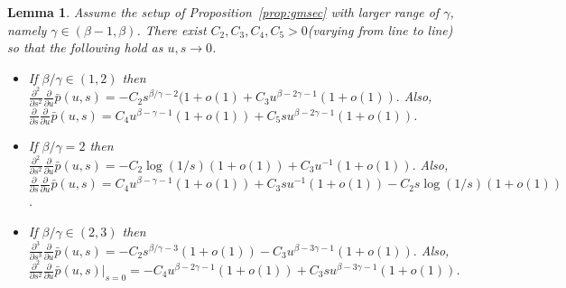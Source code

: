 \documentclass[12pt]{article}
\numberwithin{equation}{section}
\newtheorem{lemma}[thm]{Lemma}
\begin{document}
\begin{lemma}\label{lemma:doubderder} Assume the setup of Proposition~\ref{prop:gmsec} with larger range of $\gamma$,
namely $\gamma\in (\beta-1,\beta)$. There exist $C_2, C_3, C_4, C_5>0$(varying from line to line) so that the following hold as $u,s\to 0$.
\begin{itemize}
\item[(i)] If $\beta/\gamma\in (1,2)$ then 
\(
\frac{\partial^2}{\partial s^2}\frac{\partial}{\partial u}\bar p(u,s)=-C_2s^{\beta/\gamma-2}(1+o(1)+C_3 u^{\beta-2\gamma-1}(1+o(1)).\)
Also, $\frac{\partial}{\partial s}\frac{\partial}{\partial u}\bar p(u,s)= C_4u^{\beta-\gamma-1}(1+o(1))+C_5 s u^{\beta-2\gamma-1}(1+o(1))$.


\item[(ii)] If $\beta/\gamma=2$ then 
\(
\frac{\partial^2}{\partial s^2}\frac{\partial}{\partial u}\bar p(u,s)=-C_2\log(1/s)(1+o(1))+C_3 u^{-1}(1+o(1)).\)
Also, $\frac{\partial}{\partial s}\frac{\partial}{\partial u}\bar p(u,s)= C_4u^{\beta-\gamma-1}(1+o(1))+ C_3s u^{-1}(1+o(1))-C_2 s\log(1/s)(1+o(1))$.
\item[(ii)] If $\beta/\gamma\in (2,3)$ then 
\(
\frac{\partial^3}{\partial s^3}\frac{\partial}{\partial u}\bar p(u,s)=-C_2s^{\beta/\gamma-3}(1+o(1))-C_3 u^{\beta-3\gamma-1}(1+o(1)).\)
Also, $\frac{\partial^2}{\partial s^2}\frac{\partial}{\partial u}\bar p(u,s)\Big|_{s=0}=- C_4u^{\beta-2\gamma-1}(1+o(1))+C_3 s u^{\beta-3\gamma-1}(1+o(1))$.
\end{itemize}

\end{lemma}
\end{document}
